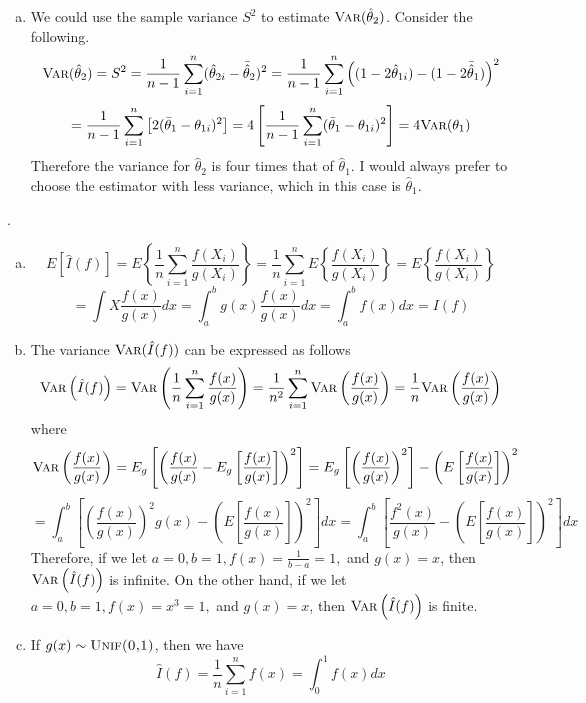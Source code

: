 \documentclass[a4paper, 10pt]{article}
\newcounter{prob_num}
\newcommand{\problem}{\vspace{20pt}\arabic{prob_num}.\stepcounter{prob_num}\par}
\begin{document}
\begin{enumerate}[(a)]
\item We could use the sample variance $S^2$ to estimate $\textsc{Var}(\hat{\theta}_2)$. Consider the following.
\[ \textsc{Var}(\hat{\theta}_2) = S^2 = \frac{1}{n-1}\sum_{i=1}^{n}(\hat{\theta}_{2i}-\bar{\hat{\theta}}_2)^2 = \frac{1}{n-1}\sum_{i=1}^{n}\left((1-2\hat{\theta}_{1i})-(1-2\bar{\hat{\theta}}_1)\right)^2 \] \[ = \frac{1}{n-1}\sum_{i=1}^{n}\left[2(\bar{\theta}_1 - \theta_{1i})^2\right] = 4\left[\frac{1}{n-1}\sum_{i=1}^{n}(\bar{\theta}_1 - \theta_{1i})^2\right] = 4\textsc{Var}(\theta_1) \]
Therefore the variance for $\hat{\theta}_2$ is four times that of $\hat{\theta}_1$. I would always prefer to choose the estimator with less variance, which in this case is $\hat{\theta}_1$.
\end{enumerate}

\problem

\begin{enumerate}[(a)]
\item
\[ E[\hat{I}(f)] = E\left\{ \frac{1}{n} \sum_{i=1}^{n}\frac{f(X_i)}{g(X_i)} \right\} = \frac{1}{n} \sum_{i=1}^{n}E\left\{ \frac{f(X_i)}{g(X_i)} \right\} = E\left\{ \frac{f(X_i)}{g(X_i)} \right\} \]
\[ = \int X \frac{f(x)}{g(x)}dx = \int_{a}^{b}g(x)\frac{f(x)}{g(x)}dx = \int_{a}^{b}f(x)dx = I(f) \]

\item The variance $\textsc{Var}(\hat{I}(f))$ can be expressed as follows
\[ \textsc{Var}\left(\hat{I}(f)\right) = \textsc{Var}\left(\frac{1}{n}\sum_{i=1}^{n}\frac{f(x)}{g(x)}\right) = \frac{1}{n^2}\sum_{i=1}^{n}\textsc{Var}\left(\frac{f(x)}{g(x)}\right) = \frac{1}{n}\textsc{Var}\left(\frac{f(x)}{g(x)}\right) \]
where
\[ \textsc{Var}\left(\frac{f(x)}{g(x)}\right) = E_g\left[\left(\frac{f(x)}{g(x)}-E_g\left[\frac{f(x)}{g(x)}\right]\right)^2\right] = E_g\left[\left(\frac{f(x)}{g(x)}\right)^2\right]-\left(E\left[\frac{f(x)}{g(x)}\right]\right)^2 \]\[ = \int_{a}^{b}\left[\left(\frac{f(x)}{g(x)}\right)^2g(x) - \left(E\left[\frac{f(x)}{g(x)}\right]\right)^2\right]dx = \int_{a}^{b}\left[\frac{f^2(x)}{g(x)} - \left(E\left[\frac{f(x)}{g(x)}\right]\right)^2\right]dx \]
Therefore, if we let $a = 0, b=1, f(x) = \frac{1}{b-a} = 1,$ and $ g(x) = x$, then $\textsc{Var}\left(\hat{I}(f)\right)$ is infinite. On the other hand, if we let $a = 0, b=1, f(x) = x^3 = 1,$ and $ g(x) = x$, then $\textsc{Var}\left(\hat{I}(f)\right)$ is finite.

\item If $g(x) \sim \textsc{Unif(0,1)}$, then we have
\[ \hat{I}(f) = \frac{1}{n}\sum_{i=1}^{n}f(x) = \int_{0}^{1}f(x)dx \]
\end{enumerate}
\end{document}
